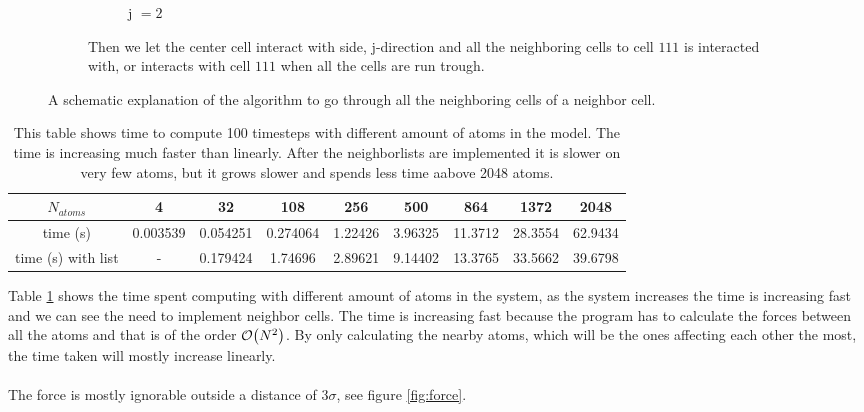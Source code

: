 \documentclass[11pt]{article}
\begin{document}
\begin{figure}
\begin{subfigure}{1\textwidth}
\begin{subfigure}[b]{0.18\textwidth}
	        \caption*{j \(= 2\)}
	        \end{subfigure}
	       	\caption{Then we let the center cell interact with side, j-direction and all the neighboring cells to cell \(111\) is interacted with, or interacts with cell \(111\) when all the cells are run trough.}
	       	\label{fig:side}
		\end{subfigure}
		\caption{A schematic explanation of the algorithm to go through all the neighboring cells of a neighbor cell.}
	\end{figure}
		




	\begin{table}
		\begin{tabular}{| c | c | c | c | c | c | c | c | c |}
		\hline
			\(N_{atoms}\)	&	4 			&	32			&	108			&	256		&	500		&	864		& 1372		&	2048
			\\ \hline
			time (s)		&	0.003539	&	0.054251	&	0.274064	&	1.22426	&	3.96325	&	11.3712	& 28.3554	& 62.9434 
			\\ \hline
			time (s) with list & -			& 0.179424		&	1.74696		&	2.89621	&	9.14402	&	13.3765	& 33.5662	& 39.6798
			\\ \hline
		\end{tabular}
		\caption{This table shows time to compute 100 timesteps with different amount of atoms in the model. The time is increasing much faster than linearly. After the neighborlists are implemented it is slower on very few atoms, but it grows slower and spends less time aabove 2048 atoms.}
	\label{tab:time_spent}
	\end{table}

	Table \ref{tab:time_spent} shows the time spent computing with different amount of atoms in the system, as the system increases the time is increasing fast and we can see the need to implement neighbor cells. The time is increasing fast because the program has to calculate the forces between all the atoms and that is of the order \(\order{N^2}\). By only calculating the nearby atoms, which will be the ones affecting each other the most, the time taken will mostly increase linearly.
\\ \\
	\noindent The force is mostly ignorable outside a distance of \(3 \sigma \), see figure \ref{fig:force}.
\end{document}
